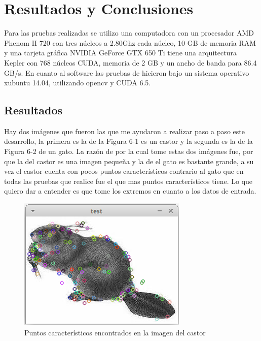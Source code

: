 \chapter{Resultados y Conclusiones}

Para las pruebas realizadas se utilizo una computadora con un procesador AMD Phenom II 720 con tres núcleos a 2.80Ghz cada núcleo, 10 GB de memoria RAM y una tarjeta gráfica NVIDIA GeForce GTX 650 Ti tiene una arquitectura Kepler con 768 núcleos CUDA, memoria de 2 GB y un ancho de banda para 86.4 GB/s. En cuanto al software las pruebas de hicieron bajo un sistema operativo xubuntu 14.04, utilizando opencv y CUDA 6.5.

\section{Resultados}

Hay dos imágenes que fueron las que me ayudaron a realizar paso a paso este desarrollo, la primera es la de la Figura 6-1 es un castor y la 
segunda es la de la Figura 6-2 de un gato. La razón de por la cual tome estas dos imágenes fue, por que la del castor es una imagen pequeña y la de el gato es bastante grande, a su vez el castor cuenta con pocos puntos característicos contrario al gato que en todas las pruebas que realice fue el que mas puntos característicos tiene. Lo que quiero dar a entender es que tome los extremos en cuanto a los datos de entrada. 

\begin{figure}[ph]
			\centering
				\includegraphics[scale=1]{img/castor.png}
			\caption{Puntos característicos encontrados en la imagen del castor}
\end{figure}


